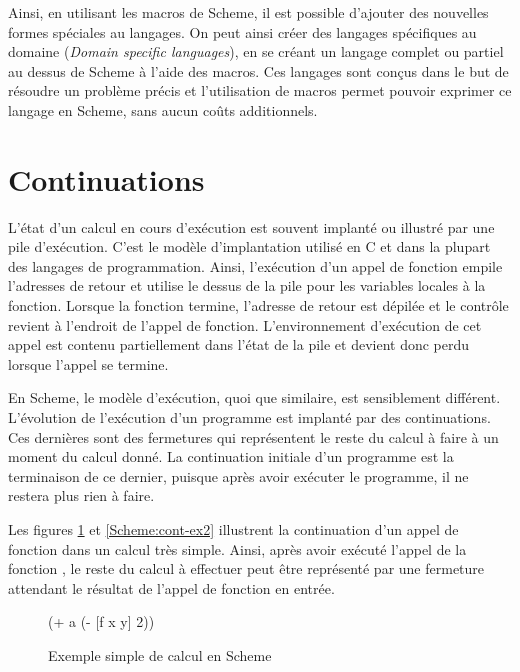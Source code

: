 \documentclass[12pt,oneside,letterpaper,francais]{book}
\newcommand{\scheme}[1]{\selectlanguage{english}{\tt #1}\selectlanguage{french}}
\begin{document}
Ainsi, en utilisant les macros de Scheme, il est possible d'ajouter
des nouvelles formes spéciales au langages. On peut ainsi créer des
langages spécifiques au domaine (\textit{Domain specific languages}),
en se créant un langage complet ou partiel au dessus de Scheme à
l'aide des macros. Ces langages sont conçus dans le but de résoudre un
problème précis et l'utilisation de macros permet pouvoir exprimer ce
langage en Scheme, sans aucun coûts additionnels.


\section{Continuations}

L'état d'un calcul en cours d'exécution est souvent implanté ou
illustré par une pile d'exécution. C'est le modèle d'implantation
utilisé en C et dans la plupart des langages de programmation. Ainsi,
l'exécution d'un appel de fonction empile l'adresses de retour et
utilise le dessus de la pile pour les variables locales à la
fonction. Lorsque la fonction termine, l'adresse de retour est dépilée
et le contrôle revient à l'endroit de l'appel de
fonction. L'environnement d'exécution de cet appel est contenu
partiellement dans l'état de la pile et devient donc perdu lorsque
l'appel se termine.

En Scheme, le modèle d'exécution, quoi que similaire, est sensiblement
différent. L'évolution de l'exécution d'un programme est implanté par
des continuations. Ces dernières sont des fermetures qui représentent
le reste du calcul à faire à un moment du calcul donné. La
continuation initiale d'un programme est la terminaison de ce dernier,
puisque après avoir exécuter le programme, il ne restera plus rien à
faire.

Les figures \ref{Scheme:cont-ex1} et \ref{Scheme:cont-ex2} illustrent
la continuation d'un appel de fonction dans un calcul très
simple. Ainsi, après avoir exécuté l'appel de la fonction \scheme{f},
le reste du calcul à effectuer peut être représenté par une fermeture
attendant le résultat de l'appel de fonction en entrée. \\

\begin{figure}[htb!]
  \begin{schemecode}
(+ a (- [f x y] 2))
  \end{schemecode}
  \caption{Exemple simple de calcul en Scheme}
  \label{Scheme:cont-ex1}
\end{figure}
\end{document}
